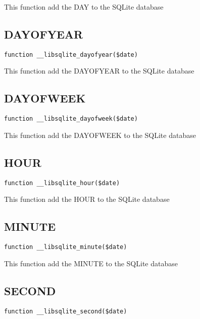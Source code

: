 \documentclass[a4paper]{book}
\begin{document}
This function add the DAY to the SQLite database

\hypertarget{toc344}{}
\subsection{DAYOFYEAR}

\begin{lstlisting}
function __libsqlite_dayofyear($date)
\end{lstlisting}

This function add the DAYOFYEAR to the SQLite database

\hypertarget{toc345}{}
\subsection{DAYOFWEEK}

\begin{lstlisting}
function __libsqlite_dayofweek($date)
\end{lstlisting}

This function add the DAYOFWEEK to the SQLite database

\hypertarget{toc346}{}
\subsection{HOUR}

\begin{lstlisting}
function __libsqlite_hour($date)
\end{lstlisting}

This function add the HOUR to the SQLite database

\hypertarget{toc347}{}
\subsection{MINUTE}

\begin{lstlisting}
function __libsqlite_minute($date)
\end{lstlisting}

This function add the MINUTE to the SQLite database

\hypertarget{toc348}{}
\subsection{SECOND}

\begin{lstlisting}
function __libsqlite_second($date)
\end{lstlisting}
\end{document}
